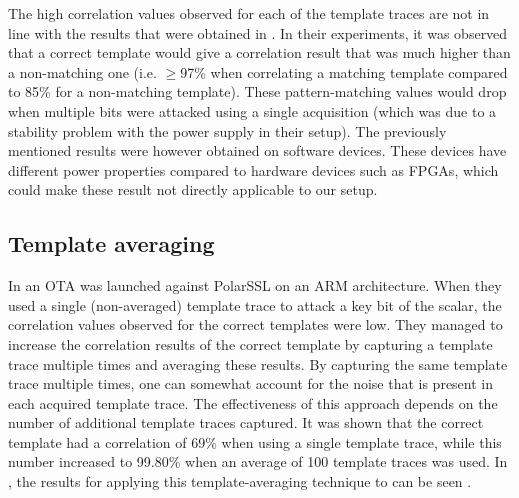 The high correlation values observed for each of the template traces are not in line with the results that were obtained in \cite{batina2014online}. 
In their experiments, it was observed that a correct template would give a correlation result that was much higher than a non-matching one (i.e. $\ge$97\% when correlating a matching template compared to 85\% for a non-matching template). 
These pattern-matching values would drop when multiple bits were attacked using a single acquisition (which was due to a stability problem with the power supply in their setup).
The previously mentioned results were however obtained on software devices.
These devices have different power properties compared to hardware devices such as FPGAs, which could make these result not directly applicable to our setup.

\subsection{Template averaging}
In \cite{dugardin2016dismantling} an OTA was launched against PolarSSL on an ARM architecture.
When they used a single (non-averaged) template trace to attack a key bit of the scalar, the correlation values observed for the correct templates were low.
They managed to increase the correlation results of the correct template by capturing a template trace multiple times and averaging these results.
By capturing the same template trace multiple times, one can somewhat account for the noise that is present in each acquired template trace.
The effectiveness of this approach depends on the number of additional template traces captured.
It was shown that the correct template had a correlation of 69\% when using a single template trace, while this number increased to 99.80\% when an average of 100 template traces was used.
In , the results for applying this template-averaging technique to {\fourq} can be seen .
%
